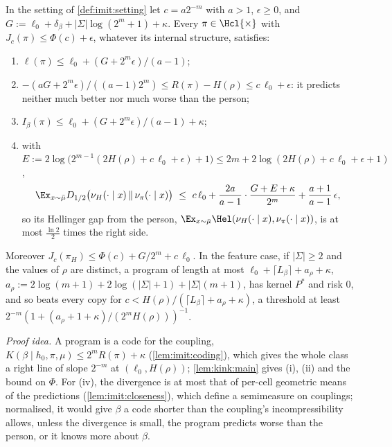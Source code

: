 \begin{theorem}\label{thm:imit:main}
In the setting of \cref{def:imit:setting} let $c=a2^{-m}$ with $a>1$, $\epsilon\ge0$, and $G:=\ell_0+\delta_\beta+|\Sigma|\log(2^m+1)+\kappa$. Every $\pi\in\Hcl{\times}$ with $J_c(\pi)\le\Phi(c)+\epsilon$, whatever its internal structure, satisfies:
\begin{enumerate}[label=(\roman*),itemsep=0pt,topsep=2pt]
\item $\ell(\pi)\le\ell_0+(G+2^m\epsilon)/(a-1)$;
\item $-(aG+2^m\epsilon)/((a-1)2^m)\le R(\pi)-H(\rho)\le c\,\ell_0+\epsilon$: it predicts neither much better nor much worse than the person;
\item $I_\beta(\pi)\le\ell_0+(G+2^m\epsilon)/(a-1)+\kappa$;
\item with $E:=2\log\big(2^{m-1}(2H(\rho)+c\,\ell_0+\epsilon)+1\big)\le2m+2\log(2H(\rho)+c\,\ell_0+\epsilon+1)$,
\[
\Ex_{x\sim\bar\mu}D_{1/2}\big(\nu_H(\cdot\mid x)\,\Vert\,\nu_\pi(\cdot\mid x)\big)\ \le\ c\,\ell_0+\frac{2a}{a-1}\cdot\frac{G+E+\kappa}{2^m}+\frac{a+1}{a-1}\,\epsilon,
\]
so its Hellinger gap from the person, $\Ex_{x\sim\bar\mu}\Hel(\nu_H(\cdot\mid x),\nu_\pi(\cdot\mid x))$, is at most $\frac{\ln2}2$ times the right side.
\end{enumerate}
Moreover $J_c(\pi_H)\le\Phi(c)+G/2^m+c\,\ell_0$. In the feature case, if $|\Sigma|\ge2$ and the values of $\rho$ are distinct, a program of length at most $\ell_0+\lceil L_\beta\rceil+a_\rho+\kappa$, $a_\rho:=2\log(m+1)+2\log(|\Sigma|+1)+|\Sigma|(m+1)$, has kernel $P^*$ and risk $0$, and so beats every copy for $c<H(\rho)/(\lceil L_\beta\rceil+a_\rho+\kappa)$, a threshold at least $2^{-m}(1+(a_\rho+1+\kappa)/(2^mH(\rho)))^{-1}$.
\end{theorem}

\emph{Proof idea.} A program is a code for the coupling, $K(\beta\mid h_0,\pi,\mu)\le2^mR(\pi)+\kappa$ (\cref{lem:imit:coding}), which gives the whole class a right line of slope $2^{-m}$ at $(\ell_0,H(\rho))$; \cref{lem:kink:main} gives (i), (ii) and the bound on $\Phi$. For (iv), the divergence is at most that of per-cell geometric means of the predictions (\cref{lem:imit:closeness}), which define a semimeasure on couplings; normalised, it would give $\beta$ a code shorter than the coupling's incompressibility allows, unless the divergence is small, the program predicts worse than the person, or it knows more about $\beta$.

